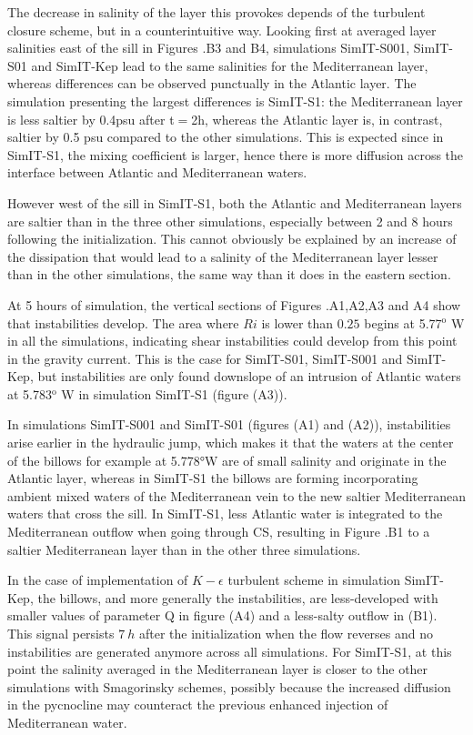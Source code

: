 The decrease in salinity of the layer this provokes depends of the turbulent closure scheme, but in a counterintuitive way. Looking first at averaged layer salinities east of the sill in Figures .B3 and B4, simulations SimIT-S001, SimIT-S01 and SimIT-Kep lead to the same salinities for the Mediterranean layer, whereas differences can be observed punctually in the Atlantic layer. The simulation presenting the largest differences is SimIT-S1: the Mediterranean layer is less saltier by 0.4psu after t$=$2h, whereas the Atlantic layer is, in contrast, saltier by 0.5 psu compared to the other simulations. This is expected since in SimIT-S1, the mixing coefficient is larger, hence there is more diffusion across the interface between Atlantic and Mediterranean waters.

However west of the sill in SimIT-S1, both the Atlantic and Mediterranean layers are saltier than in the three other simulations, especially between 2 and 8 hours following the initialization. This cannot obviously be explained by an increase of the dissipation that would lead to a salinity of the Mediterranean layer lesser than in the other simulations, the same way than it does in the eastern section.

At 5 hours of simulation, the vertical sections of Figures .A1,A2,A3 and A4 show that instabilities develop. The area where $Ri$ is lower than $0.25$ begins at 5.77$^\text{o}$ W in all the simulations, indicating shear instabilities could develop from this point in the gravity current. This is the case for SimIT-S01, SimIT-S001 and SimIT-Kep, but instabilities are only found downslope of an intrusion of Atlantic waters at 5.783$^\text{o}$ W in simulation SimIT-S1 (figure (A3)).

In simulations SimIT-S001 and SimIT-S01 (figures (A1) and (A2)), instabilities arise earlier in the hydraulic jump, which makes it that the waters at the center of the billows for example at 5.778°W are of small salinity and originate in the Atlantic layer, whereas in SimIT-S1 the billows are forming incorporating ambient mixed waters of the Mediterranean vein to the new saltier Mediterranean waters that cross the sill. In SimIT-S1, less Atlantic water is integrated to the Mediterranean outflow when going through CS, resulting in Figure .B1 to a saltier Mediterranean layer than in the other three simulations.
 
In the case of implementation of $K-\epsilon$ turbulent scheme in simulation SimIT-Kep, the billows, and more generally the instabilities, are less-developed with smaller values of parameter Q in figure (A4) and a less-salty outflow in (B1). This signal persists $7\ h$ after the initialization when the flow reverses and no instabilities are generated anymore across all simulations. For SimIT-S1, at this point the salinity averaged in the Mediterranean layer is closer to the other simulations with Smagorinsky schemes, possibly because the increased diffusion in the pycnocline may counteract the previous enhanced injection of Mediterranean water.


